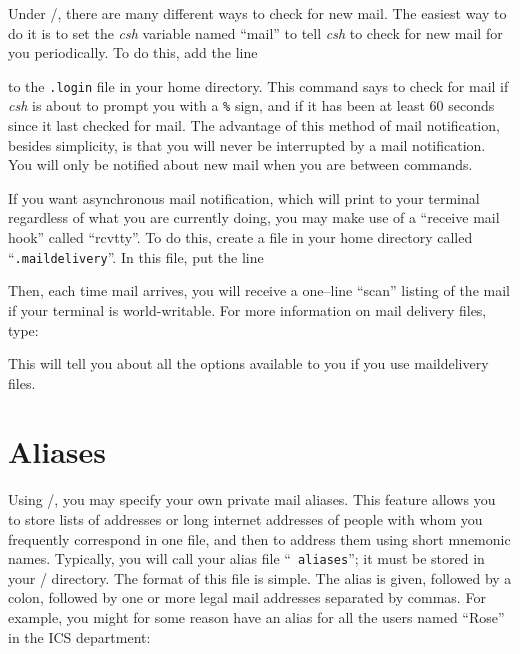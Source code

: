 Under \unix/, there are many different ways to check for new mail. The
easiest way to do it is to set the {\it csh\/} variable named ``mail''
to tell {\it csh\/} to check for new mail for you periodically. To
do this, add the line


to the {\tt .login} file in your home directory.  This command says
to check for mail if {\it csh\/} is about to prompt you with a
{\tt \%} sign, and if it has been at least 60 seconds since it last
checked for mail.  The advantage of this method of mail notification,
besides simplicity, is that you will never be interrupted by a mail
notification.  You will only be notified about new mail when you
are between commands.

If you want asynchronous mail notification, which will print to your
terminal regardless  of what you are currently doing, you may make
use of a ``receive mail hook'' called ``rcvtty''.  To do this, 
create a file in your home directory called ``{\tt .maildelivery}''.
In this file, put the line


Then, each time mail arrives, you will receive a one--line ``scan''
listing of the mail if your terminal is world-writable.  For more
information on mail delivery files, type:


This will tell you about all the options available to you if you
use maildelivery files.


\section{Aliases}

Using \MH/, you may specify your own private mail aliases.  This feature
allows you to store lists of addresses or long internet addresses of people
with whom you frequently correspond in one file, and then to address them
using short mnemonic names.  Typically, you will call your alias file ``{\tt
aliases}''; it must be stored in your \MH/ directory.  The format of this
file is simple. The alias is given, followed by a colon, followed by one or
more legal mail addresses separated by commas.  For example, you might for
some reason have an alias for all the users named ``Rose'' in the ICS
department:



